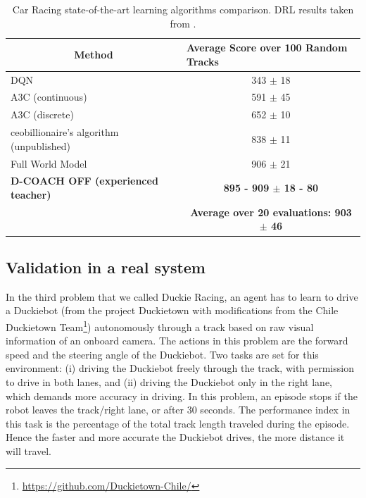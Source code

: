 \begin{table}[h]
\centering
\caption[Car Racing state-of-the-art learning algorithms comparison.]{Car Racing state-of-the-art learning algorithms comparison. DRL results taken from \cite{Ha2018}.}
\label{CarRacing_table}
\begin{tabular}{lc}
\multicolumn{1}{c}{\textbf{Method}}      & \multicolumn{1}{l}{\textbf{Average Score over 100 Random Tracks}} \\ \hline\hline
DQN                                      & 343 $\pm$ 18                                                      \\ \hline
A3C (continuous)                         & 591 $\pm$ 45                                                      \\ \hline
A3C (discrete)                           & 652 $\pm$ 10                                                      \\ \hline
ceobillionaire’s algorithm (unpublished) & 838 $\pm$ 11                                                      \\ \hline
Full World Model                         & 906 $\pm$ 21                                                      \\ \hline
\textbf{D-COACH OFF (experienced teacher)}                         & \textbf{895 - 909 $\pm$ 18 - 80} \\
& \textbf{Average over 20 evaluations: 903 $\pm$ 46}
\\ \hline
\end{tabular}
\end{table}

\subsection{Validation in a real system}
In the third problem that we called Duckie Racing, an agent has to learn to drive a Duckiebot (from the project  Duckietown \cite{Paull2017} with modifications from the Chile Duckietown Team\footnote{\url{https://github.com/Duckietown-Chile/}}) autonomously through a track based on raw visual information of an onboard camera. The actions in this problem are the forward speed and the steering angle of the Duckiebot. Two tasks are set for this environment: (i) driving the Duckiebot freely through the track, with permission to drive in both lanes, and (ii) driving the Duckiebot only in the right lane, which demands more accuracy in driving. In this problem, an episode stops if the robot leaves the track/right lane, or after 30 seconds. The performance index in this task is the percentage of the total track length traveled during the episode. Hence the faster and more accurate the Duckiebot drives, the more distance it will travel.

